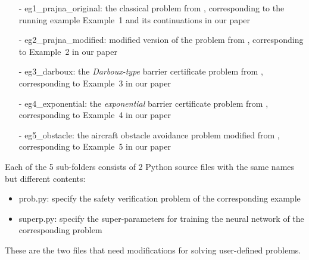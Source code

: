\documentclass{llncs}
\begin{document}
\begin{itemize}
    \item[-] {\color{blue}\textsf{eg1\_prajna\_original}}: the classical problem from \cite{Prajna04safetyverification}, corresponding to the running example 
    Example~1 and its continuations in our paper
    \item[-] {\color{blue}\textsf{eg2\_prajna\_modified}}: modified version of the problem from \cite{Prajna04safetyverification}, corresponding to Example~2 in our paper 
    \item[-] {\color{blue}\textsf{eg3\_darboux}}: the \emph{Darboux-type} barrier certificate problem from \cite{Zeng2016}, corresponding to Example~3 in our paper
    \item[-] {\color{blue}\textsf{eg4\_exponential}}: the \emph{exponential} barrier certificate problem from \cite{HengjunZhaoFM2015}, corresponding to Example~4
                in our paper 
    \item[-] {\color{blue}\textsf{eg5\_obstacle}}: the aircraft obstacle avoidance problem modified from \cite{BarryICRA2012}, corresponding to Example~5 in our paper
\end{itemize}
Each of the 5 sub-folders consists of 2 Python source files with the same names but different contents:
\begin{itemize}
    \item {\color{purple}\textsf{prob.py}}: specify the safety verification problem of the corresponding example
    \item {\color{purple}\textsf{superp.py}}: specify the super-parameters for training the neural network of the corresponding problem
\end{itemize}
These are the two files that need modifications for solving user-defined problems.
\end{document}
